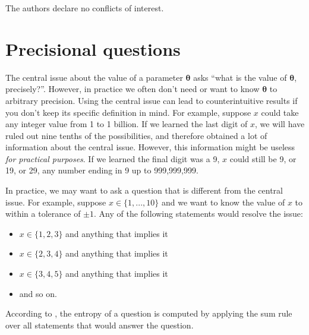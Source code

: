 \documentclass[entropy,article,accept,oneauthor,pdftex,10pt,a4paper]{mdpi}
\newcommand{\x}{\boldsymbol{\theta}}
\begin{document}

The authors declare no conflicts of interest.

%
\makeatletter
\renewcommand\@biblabel[1]{#1. }
\makeatother





\appendix
\section{Precisional questions}
\label{sec:precisional}

The central issue about the value of a parameter $\x$ asks
``what is the value of $\x$, precisely?''. However, in practice we often
don't need or want to know $\x$ to arbitrary precision. Using the central
issue can lead to counterintuitive results if you don't keep its specific
definition in mind. For example, suppose $x$ could take any integer value
from 1 to 1 billion. If we learned the last digit of $x$, we
will have ruled out nine tenths of the possibilities, and therefore obtained
a lot of information about the central issue. However,
this information might be useless {\em for practical purposes}.
If we learned the final
digit was a 9, $x$ could still be 9, or 19, or 29, any number ending in 9
up to 999,999,999.

In practice, we may
want to ask a question that is different from the central issue.
For example, suppose $x \in \{1, ..., 10\}$ and
we want to know the value of $x$ to within a tolerance
of $\pm 1$. Any of the following statements would
resolve the issue:
\begin{itemize}
\item $x \in \{1, 2, 3\}$ and anything that implies it
\item $x \in \{2, 3, 4\}$ and anything that implies it
\item $x \in \{3, 4, 5\}$ and anything that implies it
\item and so on.
\end{itemize}
According to \citet{knuth_questions}, the entropy of a question is
computed by applying the sum rule over all statements that would answer the
question.
\end{document}
